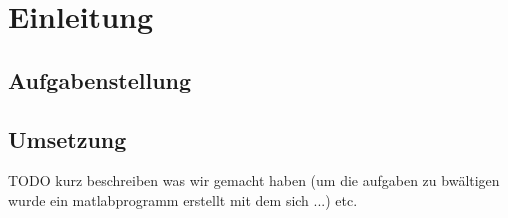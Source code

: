 \chapter{Einleitung}

\section{Aufgabenstellung}\label{sec:aufgabenstellung}

\section{Umsetzung}
TODO kurz beschreiben was wir gemacht haben (um die aufgaben zu
bwältigen wurde ein matlabprogramm erstellt mit dem sich ...) etc.
